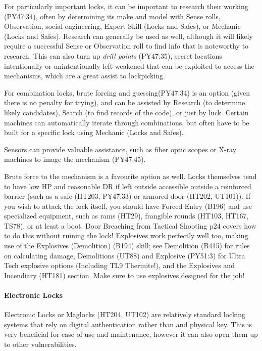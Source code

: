 \begin{multicols*}{2}
	For particularly important locks, it can be important to research their working (PY47:34), often by determining its make and model with Sense rolls, Observation, social engineering, Expert Skill (Locks and Safes), or Mechanic (Locks and Safes). Research can generally be used as well, although it will likely require a successful Sense or Observation roll to find info that is noteworthy to research. This can also turn up \textit{drill points} (PY47:35), secret locations intentionally or unintentionally left weakened that can be exploited to access the mechanisms, which are a great assist to lockpicking.
	
	For combination locks, brute forcing and guessing(PY47:34) is an option (given there is no penalty for trying), and can be assisted by Research (to determine likely candidates), Search (to find records of the code), or just by luck. Certain machines can automatically iterate through combinations, but often have to be built for a specific lock using Mechanic (Locks and Safes).
	
	Sensors can provide valuable assistance, such as fiber optic scopes or X-ray machines to image the mechanism (PY47:45).
	
	Brute force to the mechanism is a favourite option as well. Locks themselves tend to have low HP and reasonable DR if left outside accessible outside a reinforced barrier (such as a safe (HT203, PY47:33) or armored door (HT202, UT101)). If you wish to attack the lock itself, you should have Forced Entry (B196) and use specialized equipment, such as rams (HT29), frangible rounds (HT103, HT167, TS78), or at least a boot. Door Breaching from Tactical Shooting p24 covers how to do this without ruining the lock! Explosives work perfectly well too, making use of the Explosives (Demolition) (B194) skill; see Demolition (B415) for rules on calculating damage, Demolitions (UT88) and Explosive (PY51:3) for Ultra Tech explosive options (Including TL9 Thermite!), and the Explosives and Incendiary (HT181) section. Make sure to use explosives designed for the job! 
	
	\paragraph{Electronic Locks}
	
	Electronic Locks or Maglocks (HT204, UT102) are relatively standard locking systems that rely on digital authentication rather than and physical key. This is very beneficial for ease of use and maintenance, however it can also open them up to other vulnerabilities.
	

\end{multicols*}
